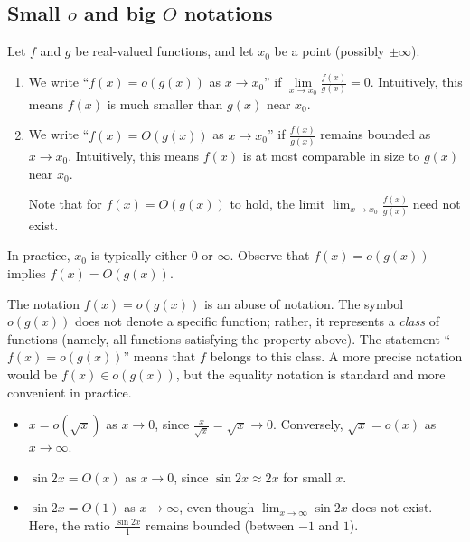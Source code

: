 \documentclass[a4paper]{article}
\begin{document}
\subsection{Small \texorpdfstring{$o$}{o} and big \texorpdfstring{$O$}{O} notations}
\begin{defi}
  Let $f$ and $g$ be real-valued functions, and let $x_0$ be a point (possibly $\pm\infty$).
  \begin{enumerate}
    \item We write ``$f(x) = o(g(x))$ as $x\to x_0$'' if $\lim\limits_{x\to x_0} \frac{f(x)}{g(x)} = 0$. Intuitively, this means $f(x)$ is much smaller than $g(x)$ near $x_0$.
    \item We write ``$f(x) = O(g(x))$ as $x\to x_0$'' if $\frac{f(x)}{g(x)}$ remains bounded as $x\to x_0$. Intuitively, this means $f(x)$ is at most comparable in size to $g(x)$ near $x_0$.

      Note that for $f(x) = O(g(x))$ to hold, the limit $\displaystyle \lim_{x\to x_0} \frac{f(x)}{g(x)}$ need not exist.
  \end{enumerate}
  In practice, $x_0$ is typically either $0$ or $\infty$. Observe that $f(x)=o(g(x))$ implies $f(x) = O(g(x))$.
\end{defi}
\begin{remark}
  The notation $f(x) = o(g(x))$ is an abuse of notation. The symbol $o(g(x))$ does not denote a specific function; rather, it represents a \emph{class} of functions (namely, all functions satisfying the property above). The statement ``$f(x) = o(g(x))$'' means that $f$ belongs to this class. A more precise notation would be $f(x) \in o(g(x))$, but the equality notation is standard and more convenient in practice.
\end{remark}

\begin{eg}\leavevmode
  \begin{itemize}
    \item $x=o(\sqrt{x})$ as $x\to 0$, since $\frac{x}{\sqrt{x}} = \sqrt{x} \to 0$. Conversely, $\sqrt{x} = o(x)$ as $x\to \infty$.
    \item $\sin 2x = O(x)$ as $x\to 0$, since $\sin 2x \approx 2x$ for small $x$.
    \item $\sin 2x = O(1)$ as $x\to \infty$, even though $\lim_{x\to\infty} \sin 2x$ does not exist. Here, the ratio $\frac{\sin 2x}{1}$ remains bounded (between $-1$ and $1$).
  \end{itemize}
\end{eg}
\end{document}
